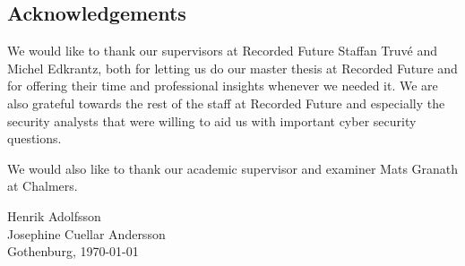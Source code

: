 
\noindent
\begin{comment}
\thesistitle\\
\thesissubtitle\\
\whatthisis\\
\\
\large{%
    Henrik Adolfsson\\
	Josephine Cuellar Andersson\\
}\\
\\
\large{%
	\whereandwhen
}
\vfill
\end{comment}

\begin{center}
    \section*{Acknowledgements}
\end{center}
We would like to thank our supervisors at Recorded Future Staffan Truvé and Michel Edkrantz, both for letting us do our master thesis at Recorded Future and for offering their time and professional insights whenever we needed it. We are also grateful towards the rest of the staff at Recorded Future and especially the security analysts that were willing to aid us with important cyber security questions.

We would also like to thank our academic supervisor and examiner Mats Granath at Chalmers.
\\[1cm]
\begin{flushright} 
Henrik  Adolfsson\\
Josephine Cuellar Andersson\\
Gothenburg, \today
\end{flushright}